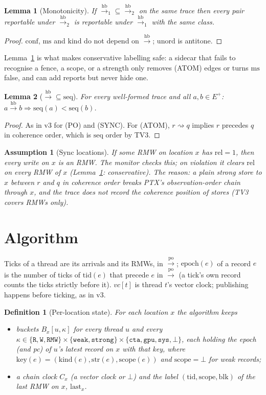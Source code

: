 \documentclass[11pt]{article}
\newtheorem{definition}{Definition}
\newtheorem{lemma}{Lemma}
\newtheorem{assumption}{Assumption}
\theoremstyle{remark}
\newcommand{\Eplus}{E^{+}}
\newcommand{\PO}{\xrightarrow{\mathrm{po}}}
\newcommand{\HB}{\xrightarrow{\mathrm{hb}}}
\newcommand{\tid}{\mathrm{tid}}
\newcommand{\kind}{\mathrm{kind}}
\newcommand{\str}{\mathrm{str}}
\newcommand{\scope}{\mathrm{scope}}
\newcommand{\blk}{\mathrm{blk}}
\newcommand{\rel}{\mathrm{rel}}
\newcommand{\ms}{\mathrm{ms}}
\newcommand{\conf}{\mathrm{conf}}
\newcommand{\unord}{\mathrm{unord}}
\newcommand{\seq}{\mathrm{seq}}
\newcommand{\epoch}{\mathrm{epoch}}
\newcommand{\vc}{\mathit{vc}}
\newcommand{\chain}{\rightsquigarrow}
\newcommand{\Chain}{C}
\newcommand{\bucket}{\mathrm{key}}
\begin{document}
\begin{lemma}[Monotonicity]\label{lem:mono}
If $\HB_1\subseteq\HB_2$ on the same trace then every pair reportable under
$\HB_2$ is reportable under $\HB_1$ with the same class.
\end{lemma}
\begin{proof}
$\conf$, $\ms$ and $\kind$ do not depend on $\HB$; $\unord$ is antitone.
\end{proof}

Lemma~\ref{lem:mono} is what makes conservative labelling safe: a sidecar that
fails to recognise a fence, a scope, or a strength only removes (ATOM) edges or
turns $\ms$ false, and can add reports but never hide one.

\begin{lemma}[$\HB\subseteq\seq$]\label{lem:seq}
For every well-formed trace and all $a,b\in\Eplus$: $a\HB b\Rightarrow
\seq(a)<\seq(b)$.
\end{lemma}
\begin{proof}
As in v3 for (PO) and (SYNC). For (ATOM), $r\chain q$ implies $r$ precedes $q$
in coherence order, which is $\seq$ order by TV3.
\end{proof}

\begin{assumption}[Sync locations]\label{as:sync}
If some RMW on location $x$ has $\rel=1$, then every write on $x$ is an RMW.
The monitor checks this; on violation it clears $\rel$ on every RMW of $x$
(Lemma~\ref{lem:mono}: conservative). The reason: a plain strong store to $x$
between $r$ and $q$ in coherence order breaks PTX's observation-order chain
through $x$, and the trace does not record the coherence position of stores
(TV3 covers RMWs only).
\end{assumption}

\section{Algorithm}

Ticks of a thread are its arrivals and its RMWs, in $\PO$; $\epoch(e)$ of a
record $e$ is the number of ticks of $\tid(e)$ that precede $e$ in $\PO$
(a tick's own record counts the ticks strictly before it). $\vc[t]$ is thread
$t$'s vector clock; publishing happens before ticking, as in v3.

\begin{definition}[Per-location state]\label{def:state}
For each location $x$ the algorithm keeps
\begin{itemize}[nosep]
\item buckets $B_x[u,\kappa]$ for every thread $u$ and every
      $\kappa\in\{\mathtt{R},\mathtt{W},\mathtt{RMW}\}\times
      \{\mathtt{weak},\mathtt{strong}\}\times\{\mathtt{cta},\mathtt{gpu},\mathtt{sys},\bot\}$,
      each holding the epoch (and pc) of $u$'s latest record on $x$ with that
      key, where $\bucket(e)=(\kind(e),\str(e),\scope(e))$ and
      $\scope=\bot$ for weak records;
\item a chain clock $\Chain_x$ (a vector clock or $\bot$) and the label
      $(\tid,\scope,\blk)$ of the last RMW on $x$, $\mathrm{last}_x$.
\end{itemize}
\end{definition}
\end{document}

